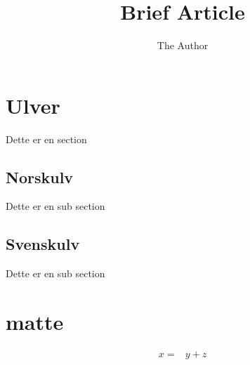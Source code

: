 \documentclass[11pt, oneside]{article}   	%
\title{Brief Article}
\author{The Author}
\begin{document}
\maketitle



\newpage
\section{Ulver}
Dette er en section 

\subsection{Norskulv}
Dette er en sub section

\subsection{Svenskulv}
Dette er en sub section



\section{matte}

\begin{align} 
	x = {}& y + z \\
\end{align}
\end{document}
